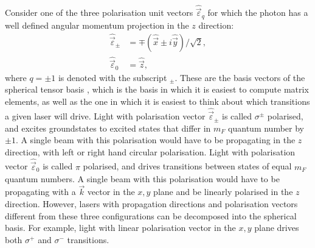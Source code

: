 Consider one of the three polarisation unit vectors $\hat{\vec\varepsilon}_q$ for which the photon has a well defined angular momentum projection in the $z$ direction:
\begin{align}
\hat{\vec\varepsilon}_{\pm} &= \mp(\hat{\vec{x}} \pm i \hat{\vec y})/\sqrt{2},\\
\hat{\vec\varepsilon}_{0} &= \hat{\vec z},
\end{align}
where $q=\pm1$ is denoted with the subscript $_\pm$. These are the basis vectors of the spherical tensor basis \cite{steck_quantum_2017}, which is the basis in which it is easiest to compute matrix elements, as well as the one in which it is easiest to think about which transitions a given laser will drive. Light with polarisation vector $\hat{\vec\varepsilon}_{\pm}$ is called $\sigma^\pm$ polarised, and excites groundstates to excited states that differ in $m_F$ quantum number by $\pm 1$. A single beam with this polarisation would have to be propagating in the $z$ direction, with left or right hand circular polarisation. Light with polarisation vector $\hat{\vec\varepsilon}_0$ is called $\pi$ polarised, and drives transitions between states of equal $m_F$ quantum numbers. A single beam with this polarisation would have to be propagating with a $\vec k$ vector in the $x,y$ plane and be linearly polarised in the $z$ direction. However, lasers with propagation directions and polarisation vectors different from these three configurations can be decomposed into the spherical basis. For example, light with linear polarisation vector in the $x,y$ plane drives both $\sigma^+$ and $\sigma^-$ transitions.

